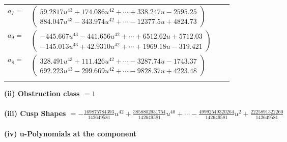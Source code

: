 \documentclass[1p]{elsarticle_modified}
\theoremstyle{definition}
\begin{document}
\begin{tabular}{m{7pt} m{180pt} m{7pt} m{180pt} }
\flushright $a_{7}=$&$\begin{pmatrix}59.2817 u^{43}+174.086 u^{42}+\cdots+338.247 u-2595.25\\884.047 u^{43}-343.974 u^{42}+\cdots-12377.5 u+4824.73\end{pmatrix}$ \\
\flushright $a_{9}=$&$\begin{pmatrix}-445.667 u^{43}-441.656 u^{42}+\cdots+6512.62 u+5712.03\\-145.013 u^{43}+42.9310 u^{42}+\cdots+1969.18 u-319.421\end{pmatrix}$ \\
\flushright $a_{8}=$&$\begin{pmatrix}328.491 u^{43}+111.426 u^{42}+\cdots-3287.74 u-1743.37\\692.223 u^{43}-299.669 u^{42}+\cdots-9828.37 u+4223.48\end{pmatrix}$\\&\end{tabular}
\flushleft \textbf{(ii) Obstruction class $= 1$}\\~\\
\flushleft \textbf{(iii) Cusp Shapes $= -\frac{169875784393}{142649581} u^{42}+\frac{3858802931754}{142649581} u^{40}+\cdots-\frac{49992549320264}{142649581} u^2+\frac{2225891322260}{142649581}$}\\~\\
\newpage\renewcommand{\arraystretch}{1}
\flushleft \textbf{(iv) u-Polynomials at the component}\newline \\
\end{document}

